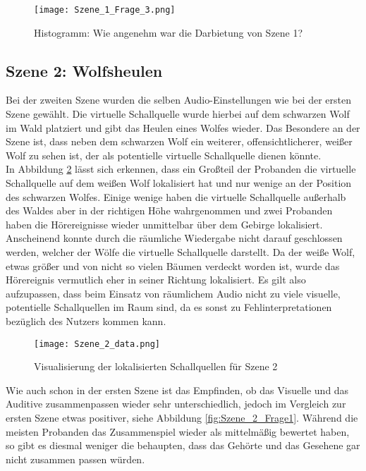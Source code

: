    \begin{figure}[H]
\centering
\texttt{[image: Szene\_1\_Frage\_3.png]}
\caption{Histogramm: Wie angenehm war die Darbietung von Szene 1?}
\label{fig:Szene_1_Frage3}
\end{figure} 



 \subsection{Szene 2: Wolfsheulen}
 Bei der zweiten Szene wurden die selben Audio-Einstellungen wie bei der ersten Szene gewählt. Die virtuelle Schallquelle wurde hierbei auf dem schwarzen Wolf im Wald platziert und gibt das Heulen eines Wolfes wieder. Das Besondere an der Szene ist, dass neben dem schwarzen Wolf ein weiterer, offensichtlicherer, weißer Wolf zu sehen ist, der als potentielle virtuelle Schallquelle dienen könnte. \\
 
In Abbildung \ref{fig:Szene_2_data} lässt sich erkennen, dass ein Großteil der Probanden die virtuelle Schallquelle auf dem weißen Wolf lokalisiert hat und nur wenige an der Position des schwarzen Wolfes. Einige wenige haben die virtuelle Schallquelle außerhalb des Waldes aber in der richtigen Höhe wahrgenommen und zwei Probanden haben die Hörereignisse wieder unmittelbar über dem Gebirge lokalisiert.  \\

Anscheinend konnte durch die räumliche Wiedergabe nicht darauf geschlossen werden, welcher der Wölfe die virtuelle Schallquelle darstellt. Da der weiße Wolf, etwas größer und von nicht so vielen Bäumen verdeckt worden ist, wurde das Hörereignis vermutlich eher in seiner Richtung lokalisiert. Es gilt also aufzupassen, dass beim Einsatz von räumlichem Audio nicht zu viele visuelle, potentielle Schallquellen im Raum sind, da es sonst zu Fehlinterpretationen bezüglich des Nutzers kommen kann. 
 
   \begin{figure}[H]
\centering
\texttt{[image: Szene\_2\_data.png]}
\caption{Visualisierung der lokalisierten Schallquellen für Szene 2}
\label{fig:Szene_2_data}
\end{figure} 

Wie auch schon in der ersten Szene ist das Empfinden, ob das Visuelle und das Auditive zusammenpassen wieder sehr unterschiedlich, jedoch im Vergleich zur ersten Szene etwas positiver, siehe Abbildung \ref{fig:Szene_2_Frage1}. Während die meisten Probanden das Zusammenspiel wieder als mittelmäßig bewertet haben, so gibt es diesmal weniger die behaupten, dass das Gehörte und das Gesehene gar nicht zusammen passen würden. 

